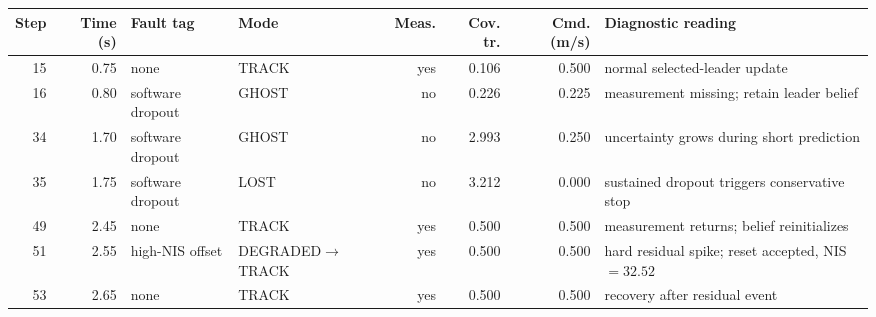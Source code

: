 \begin{tabular}{r r l l r r r l}
\toprule
\textbf{Step} & \textbf{Time (s)} & \textbf{Fault tag} & \textbf{Mode} & \textbf{Meas.} & \textbf{Cov. tr.} & \textbf{Cmd. (m/s)} & \textbf{Diagnostic reading} \\
\midrule
15 & 0.75 & none & TRACK & yes & 0.106 & 0.500 & normal selected-leader update \\
16 & 0.80 & software dropout & GHOST & no & 0.226 & 0.225 & measurement missing; retain leader belief \\
34 & 1.70 & software dropout & GHOST & no & 2.993 & 0.250 & uncertainty grows during short prediction \\
35 & 1.75 & software dropout & LOST & no & 3.212 & 0.000 & sustained dropout triggers conservative stop \\
49 & 2.45 & none & TRACK & yes & 0.500 & 0.500 & measurement returns; belief reinitializes \\
51 & 2.55 & high-NIS offset & DEGRADED$\rightarrow$TRACK & yes & 0.500 & 0.500 & hard residual spike; reset accepted, NIS $=32.52$ \\
53 & 2.65 & none & TRACK & yes & 0.500 & 0.500 & recovery after residual event \\
\bottomrule
\end{tabular}
